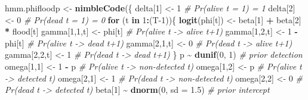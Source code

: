 \documentclass[
  12pt,
]{krantz}
\newenvironment{Shaded}{\begin{snugshade}}{\end{snugshade}}
\newcommand{\AttributeTok}[1]{\textcolor[rgb]{0.13,0.29,0.53}{#1}}
\newcommand{\CommentTok}[1]{\textcolor[rgb]{0.56,0.35,0.01}{\textit{#1}}}
\newcommand{\ControlFlowTok}[1]{\textcolor[rgb]{0.13,0.29,0.53}{\textbf{#1}}}
\newcommand{\DecValTok}[1]{\textcolor[rgb]{0.00,0.00,0.81}{#1}}
\newcommand{\FloatTok}[1]{\textcolor[rgb]{0.00,0.00,0.81}{#1}}
\newcommand{\FunctionTok}[1]{\textcolor[rgb]{0.13,0.29,0.53}{\textbf{#1}}}
\newcommand{\NormalTok}[1]{#1}
\newcommand{\OtherTok}[1]{\textcolor[rgb]{0.56,0.35,0.01}{#1}}
\newcommand{\SpecialCharTok}[1]{\textcolor[rgb]{0.81,0.36,0.00}{\textbf{#1}}}
\begin{document}
\begin{Shaded}
\begin{Highlighting}[]
\NormalTok{hmm.phifloodp }\OtherTok{\textless{}{-}} \FunctionTok{nimbleCode}\NormalTok{(\{}
\NormalTok{  delta[}\DecValTok{1}\NormalTok{] }\OtherTok{\textless{}{-}} \DecValTok{1}                 \CommentTok{\# Pr(alive t = 1) = 1}
\NormalTok{  delta[}\DecValTok{2}\NormalTok{] }\OtherTok{\textless{}{-}} \DecValTok{0}                 \CommentTok{\# Pr(dead t = 1) = 0}
  \ControlFlowTok{for}\NormalTok{ (t }\ControlFlowTok{in} \DecValTok{1}\SpecialCharTok{:}\NormalTok{(T}\DecValTok{{-}1}\NormalTok{))\{}
    \FunctionTok{logit}\NormalTok{(phi[t]) }\OtherTok{\textless{}{-}}\NormalTok{ beta[}\DecValTok{1}\NormalTok{] }\SpecialCharTok{+}\NormalTok{ beta[}\DecValTok{2}\NormalTok{] }\SpecialCharTok{*}\NormalTok{ flood[t]}
\NormalTok{    gamma[}\DecValTok{1}\NormalTok{,}\DecValTok{1}\NormalTok{,t] }\OtherTok{\textless{}{-}}\NormalTok{ phi[t]      }\CommentTok{\# Pr(alive t {-}\textgreater{} alive t+1)}
\NormalTok{    gamma[}\DecValTok{1}\NormalTok{,}\DecValTok{2}\NormalTok{,t] }\OtherTok{\textless{}{-}} \DecValTok{1} \SpecialCharTok{{-}}\NormalTok{ phi[t]  }\CommentTok{\# Pr(alive t {-}\textgreater{} dead t+1)}
\NormalTok{    gamma[}\DecValTok{2}\NormalTok{,}\DecValTok{1}\NormalTok{,t] }\OtherTok{\textless{}{-}} \DecValTok{0}           \CommentTok{\# Pr(dead t {-}\textgreater{} alive t+1)}
\NormalTok{    gamma[}\DecValTok{2}\NormalTok{,}\DecValTok{2}\NormalTok{,t] }\OtherTok{\textless{}{-}} \DecValTok{1}           \CommentTok{\# Pr(dead t {-}\textgreater{} dead t+1)}
\NormalTok{  \}}
\NormalTok{  p }\SpecialCharTok{\textasciitilde{}} \FunctionTok{dunif}\NormalTok{(}\DecValTok{0}\NormalTok{, }\DecValTok{1}\NormalTok{)               }\CommentTok{\# prior detection}
\NormalTok{  omega[}\DecValTok{1}\NormalTok{,}\DecValTok{1}\NormalTok{] }\OtherTok{\textless{}{-}} \DecValTok{1} \SpecialCharTok{{-}}\NormalTok{ p           }\CommentTok{\# Pr(alive t {-}\textgreater{} non{-}detected t)}
\NormalTok{  omega[}\DecValTok{1}\NormalTok{,}\DecValTok{2}\NormalTok{] }\OtherTok{\textless{}{-}}\NormalTok{ p               }\CommentTok{\# Pr(alive t {-}\textgreater{} detected t)}
\NormalTok{  omega[}\DecValTok{2}\NormalTok{,}\DecValTok{1}\NormalTok{] }\OtherTok{\textless{}{-}} \DecValTok{1}               \CommentTok{\# Pr(dead t {-}\textgreater{} non{-}detected t)}
\NormalTok{  omega[}\DecValTok{2}\NormalTok{,}\DecValTok{2}\NormalTok{] }\OtherTok{\textless{}{-}} \DecValTok{0}               \CommentTok{\# Pr(dead t {-}\textgreater{} detected t)}
\NormalTok{  beta[}\DecValTok{1}\NormalTok{] }\SpecialCharTok{\textasciitilde{}} \FunctionTok{dnorm}\NormalTok{(}\DecValTok{0}\NormalTok{, }\AttributeTok{sd =} \FloatTok{1.5}\NormalTok{)  }\CommentTok{\# prior intercept}

\end{Highlighting}
\end{Shaded}
\end{document}
